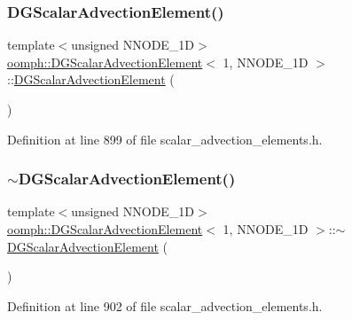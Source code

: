\subsubsection{\texorpdfstring{D\+G\+Scalar\+Advection\+Element()}{DGScalarAdvectionElement()}}
{\footnotesize\ttfamily template$<$unsigned N\+N\+O\+D\+E\+\_\+1D$>$ \\
\hyperlink{classoomph_1_1DGScalarAdvectionElement}{oomph\+::\+D\+G\+Scalar\+Advection\+Element}$<$ 1, N\+N\+O\+D\+E\+\_\+1D $>$\+::\hyperlink{classoomph_1_1DGScalarAdvectionElement}{D\+G\+Scalar\+Advection\+Element} (\begin{DoxyParamCaption}{ }\end{DoxyParamCaption})\hspace{0.3cm}{\ttfamily [inline]}}



Definition at line 899 of file scalar\+\_\+advection\+\_\+elements.\+h.

\mbox{\label{classoomph_1_1DGScalarAdvectionElement_3_011_00_01NNODE__1D_01_4_a586b83379ef09c417989485b12fbf5ae}} 
\subsubsection{\texorpdfstring{$\sim$\+D\+G\+Scalar\+Advection\+Element()}{~DGScalarAdvectionElement()}}
{\footnotesize\ttfamily template$<$unsigned N\+N\+O\+D\+E\+\_\+1D$>$ \\
\hyperlink{classoomph_1_1DGScalarAdvectionElement}{oomph\+::\+D\+G\+Scalar\+Advection\+Element}$<$ 1, N\+N\+O\+D\+E\+\_\+1D $>$\+::$\sim$\hyperlink{classoomph_1_1DGScalarAdvectionElement}{D\+G\+Scalar\+Advection\+Element} (\begin{DoxyParamCaption}{ }\end{DoxyParamCaption})\hspace{0.3cm}{\ttfamily [inline]}}



Definition at line 902 of file scalar\+\_\+advection\+\_\+elements.\+h.




